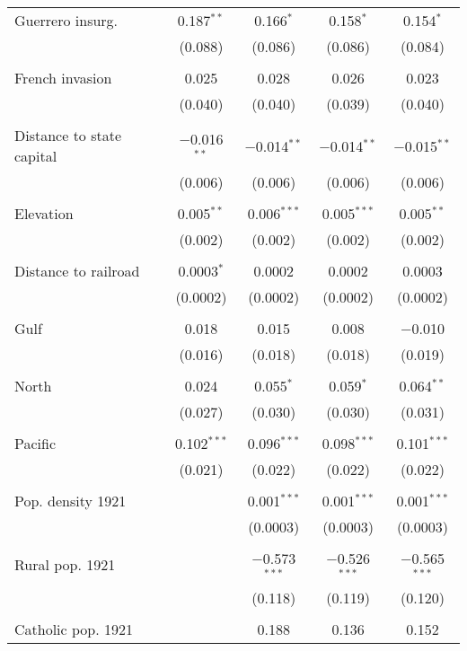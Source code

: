 \begin{table}[!htbp]
\begin{tabular}{@{\extracolsep{5pt}}lccccc}
 Guerrero insurg. &  & 0.187$^{**}$ & 0.166$^{*}$ & 0.158$^{*}$ & 0.154$^{*}$ \\ 
  &  & (0.088) & (0.086) & (0.086) & (0.084) \\ 
  & & & & & \\ 
 French invasion &  & 0.025 & 0.028 & 0.026 & 0.023 \\ 
  &  & (0.040) & (0.040) & (0.039) & (0.040) \\ 
  & & & & & \\ 
 Distance to state capital &  & $-$0.016$^{**}$ & $-$0.014$^{**}$ & $-$0.014$^{**}$ & $-$0.015$^{**}$ \\ 
  &  & (0.006) & (0.006) & (0.006) & (0.006) \\ 
  & & & & & \\ 
 Elevation &  & 0.005$^{**}$ & 0.006$^{***}$ & 0.005$^{***}$ & 0.005$^{**}$ \\ 
  &  & (0.002) & (0.002) & (0.002) & (0.002) \\ 
  & & & & & \\ 
 Distance to railroad &  & 0.0003$^{*}$ & 0.0002 & 0.0002 & 0.0003 \\ 
  &  & (0.0002) & (0.0002) & (0.0002) & (0.0002) \\ 
  & & & & & \\ 
 Gulf &  & 0.018 & 0.015 & 0.008 & $-$0.010 \\ 
  &  & (0.016) & (0.018) & (0.018) & (0.019) \\ 
  & & & & & \\ 
 North &  & 0.024 & 0.055$^{*}$ & 0.059$^{*}$ & 0.064$^{**}$ \\ 
  &  & (0.027) & (0.030) & (0.030) & (0.031) \\ 
  & & & & & \\ 
 Pacific &  & 0.102$^{***}$ & 0.096$^{***}$ & 0.098$^{***}$ & 0.101$^{***}$ \\ 
  &  & (0.021) & (0.022) & (0.022) & (0.022) \\ 
  & & & & & \\ 
 Pop. density 1921 &  &  & 0.001$^{***}$ & 0.001$^{***}$ & 0.001$^{***}$ \\ 
  &  &  & (0.0003) & (0.0003) & (0.0003) \\ 
  & & & & & \\ 
 Rural pop. 1921 &  &  & $-$0.573$^{***}$ & $-$0.526$^{***}$ & $-$0.565$^{***}$ \\ 
  &  &  & (0.118) & (0.119) & (0.120) \\ 
  & & & & & \\ 
 Catholic pop. 1921 &  &  & 0.188 & 0.136 & 0.152 \\ 

\end{tabular}
\end{table}
